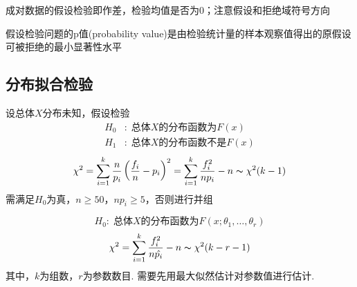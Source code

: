 \par * 成对数据的假设检验即作差，检验均值是否为$0$；注意假设和拒绝域符号方向
\begin{definition}[p值]
假设检验问题的p值(probability value)是由检验统计量的样本观察值得出的原假设可被拒绝的最小显著性水平
\end{definition}

\subsection{分布拟合检验}
\begin{theorem}[分布拟合检验]
设总体$X$分布未知，假设检验
\[\begin{aligned}
H_0&:\;\text{总体$X$的分布函数为}F(x)\\
H_1&:\;\text{总体$X$的分布函数不是}F(x)
\end{aligned}\]
\[\chi^2=\sum_{i=1}^k\frac{n}{p_i}\left(\frac{f_i}{n}-p_i\right)^2=\sum_{i=1}^k\dfrac{f_i^2}{np_i}-n\thicksim\chi^2(k-1)\]
需满足$H_0$为真，$n\geq 50$，$np_i\geq 5$，否则进行并组
\end{theorem}
\begin{theorem}[分布族的拟合检验]
\[H_0:\;\text{总体$X$的分布函数为}F(x;\theta_1,\ldots,\theta_r)\]
\[\chi^2=\sum_{i=1}^k\dfrac{f_i^2}{n\hat{p_i}}-n\thicksim\chi^2(k-r-1)\]
其中，$k$为组数，$r$为参数数目.
需要先用最大似然估计对参数值进行估计.
\end{theorem}